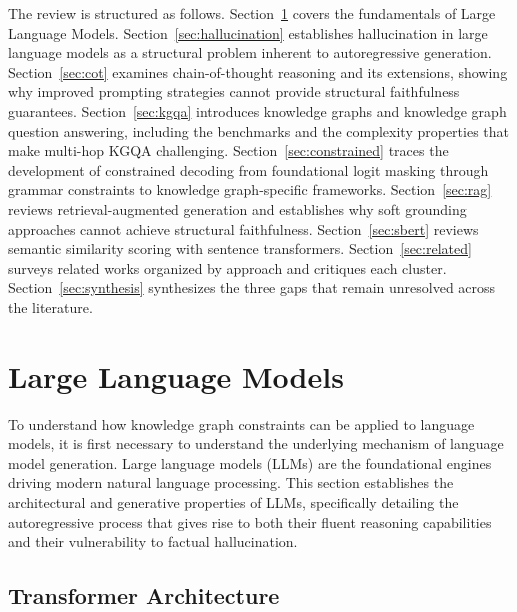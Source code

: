 The review is structured as follows. Section~\ref{sec:llms} covers the fundamentals of Large Language Models. Section~\ref{sec:hallucination} establishes hallucination in large language models as a structural problem inherent to autoregressive generation. Section~\ref{sec:cot} examines chain-of-thought reasoning and its extensions, showing why improved prompting strategies cannot provide structural faithfulness guarantees. Section~\ref{sec:kgqa} introduces knowledge graphs and knowledge graph question answering, including the benchmarks and the complexity properties that make multi-hop KGQA challenging. Section~\ref{sec:constrained} traces the development of constrained decoding from foundational logit masking through grammar constraints to knowledge graph-specific frameworks. Section~\ref{sec:rag} reviews retrieval-augmented generation and establishes why soft grounding approaches cannot achieve structural faithfulness. Section~\ref{sec:sbert} reviews semantic similarity scoring with sentence transformers. Section~\ref{sec:related} surveys related works organized by approach and critiques each cluster. Section~\ref{sec:synthesis} synthesizes the three gaps that remain unresolved across the literature.

\section{Large Language Models}
\label{sec:llms}

To understand how knowledge graph constraints can be applied to language models, it is first necessary to understand the underlying mechanism of language model generation. Large language models (LLMs) are the foundational engines driving modern natural language processing. This section establishes the architectural and generative properties of LLMs, specifically detailing the autoregressive process that gives rise to both their fluent reasoning capabilities and their vulnerability to factual hallucination.

\subsection{Transformer Architecture}

